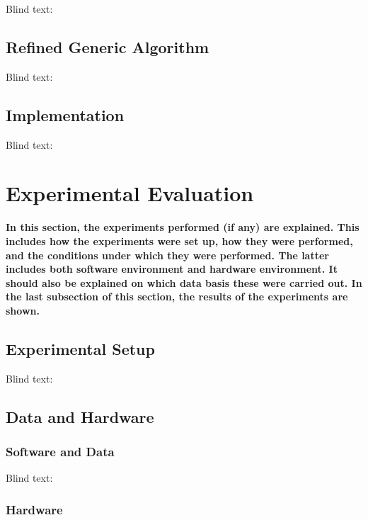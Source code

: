 Blind text:

\lipsum[1]

\subsection{Refined Generic Algorithm}
\label{subsec:refined_algo}

Blind text:

\lipsum[1]

\subsection{Implementation}
\label{subsec:implementation}

Blind text:

\lipsum[1]


\section{Experimental Evaluation}
\label{sec:evaluation}

\textbf{In this section, the experiments performed (if any) are explained. This
includes how the experiments were set up, how they were performed, and the
conditions under which they were performed. The latter includes both software
environment and hardware environment. It should also be explained on which data
basis these were carried out. In the last subsection of this section, the
results of the experiments are shown.}

\subsection{Experimental Setup}
\label{subsec:exp_setup}

Blind text:

\lipsum[1]

\subsection{Data and Hardware}
\label{subsec:hardware}

\subsubsection{Software and Data}
\label{subsubsec:software}

Blind text:

\lipsum[1]

\subsubsection{Hardware}
\label{subsubsec:hardware}

